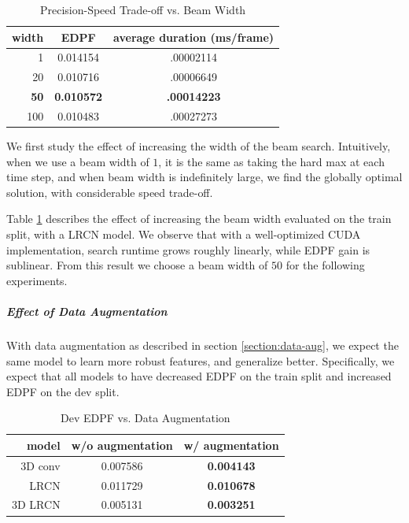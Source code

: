 \documentclass[10pt,twocolumn,letterpaper]{article}
\begin{document}
\begin{table}[]
\centering
\caption{Precision-Speed Trade-off vs. Beam Width}
\label{tab:beam}
\begin{tabular}{@{}rcc@{}}
\toprule
width    & EDPF     & average duration (ms/frame) \\ \midrule
1   & 0.014154 & .00002114                 \\
20  & 0.010716 & .00006649                 \\
\textbf{50}  & \textbf{0.010572} & \textbf{.00014223 }                \\
100 & 0.010483 & .00027273                 \\ \bottomrule
\end{tabular}
\end{table}

We first study the effect of increasing the width of the beam search. Intuitively, when we use a beam width of $1$, it is the same as taking the hard max at each time step, and when beam width is indefinitely large, we find the globally optimal solution, with considerable speed trade-off. 

Table \ref{tab:beam} describes the effect of increasing the beam width evaluated on the train split, with a LRCN model. We observe that with a well-optimized CUDA implementation, search runtime grows roughly linearly, while EDPF gain is sublinear. From this result we choose a beam width of $50$ for the following experiments. 

\vspace{-3mm}
\subparagraph{Effect of Data Augmentation}

With data augmentation as described in section \ref{section:data-aug}, we expect the same model to learn more robust features, and generalize better. Specifically, we expect that all models to have decreased EDPF on the train split and increased EDPF on the dev split. 


\begin{table}[]
\centering
\caption{Dev EDPF vs. Data Augmentation}
\label{tab:aug}
\begin{tabular}{@{}rcc@{}}
\toprule
model   & w/o augmentation & \textbf{w/ augmentation} \\ \midrule
3D conv & 0.007586         & \textbf{0.004143}       \\
LRCN    & 0.011729         & \textbf{0.010678}       \\
3D LRCN & 0.005131         & \textbf{0.003251}       \\ \bottomrule
\end{tabular}
\end{table}
\end{document}
